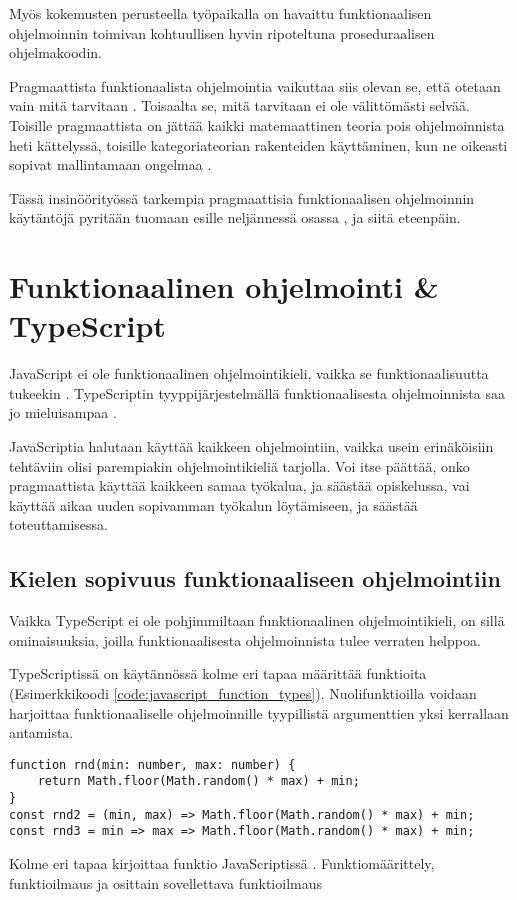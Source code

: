Myös kokemusten perusteella työpaikalla on havaittu funktionaalisen ohjelmoinnin toimivan kohtuullisen hyvin ripoteltuna proseduraalisen ohjelmakoodin.

Pragmaattista funktionaalista ohjelmointia vaikuttaa siis olevan se, että otetaan vain mitä tarvitaan \cite{dear_functional_bros,martin2017pragmaticfp,cantarella_fp_haitat}. Toisaalta se, mitä tarvitaan ei ole välittömästi selvää. Toisille pragmaattista on jättää kaikki matemaattinen teoria pois ohjelmoinnista heti kättelyssä, toisille kategoriateorian rakenteiden käyttäminen, kun ne oikeasti sopivat mallintamaan ongelmaa \cite{holvikari2021category,martin2017pragmaticfp}.

Tässä insinöörityössä tarkempia pragmaattisia funktionaalisen ohjelmoinnin käytäntöjä pyritään tuomaan esille neljännessä osassa , ja siitä eteenpäin.

\section{Funktionaalinen ohjelmointi \& TypeScript}
JavaScript ei ole funktionaalinen ohjelmointikieli, vaikka se funktionaalisuutta tukeekin \cite{is_reduce_bad}. TypeScriptin tyyppijärjestelmällä funktionaalisesta ohjelmoinnista saa jo mieluisampaa \cite{holvikari2021category}.

JavaScriptia halutaan käyttää kaikkeen ohjelmointiin, vaikka usein erinäköisiin tehtäviin olisi parempiakin ohjelmointikieliä tarjolla. Voi itse päättää, onko pragmaattista käyttää kaikkeen samaa työkalua, ja säästää opiskelussa, vai käyttää aikaa uuden sopivamman työkalun löytämiseen, ja säästää toteuttamisessa.


\subsection{Kielen sopivuus funktionaaliseen ohjelmointiin}

Vaikka TypeScript ei ole pohjimmiltaan funktionaalinen ohjelmointikieli, on sillä ominaisuuksia, joilla funktionaalisesta ohjelmoinnista tulee verraten helppoa.

TypeScriptissä on käytännössä kolme eri tapaa määrittää funktioita (Esimerkkikoodi \ref{code:javascript_function_types}). Nuolifunktioilla voidaan harjoittaa funktionaaliselle ohjelmoinnille tyypillistä argumenttien yksi kerrallaan antamista.


\begin{code}
    \begin{verbatim}
function rnd(min: number, max: number) { 
	return Math.floor(Math.random() * max) + min;
}
const rnd2 = (min, max) => Math.floor(Math.random() * max) + min;
const rnd3 = min => max => Math.floor(Math.random() * max) + min;
\end{verbatim}
    \caption{Kolme eri tapaa kirjoittaa funktio JavaScriptissä \cite{okhravi-g-discussion}. Funktiomäärittely, funktioilmaus ja osittain sovellettava funktioilmaus}
    \label{code:javascript_function_types}
\end{code}


